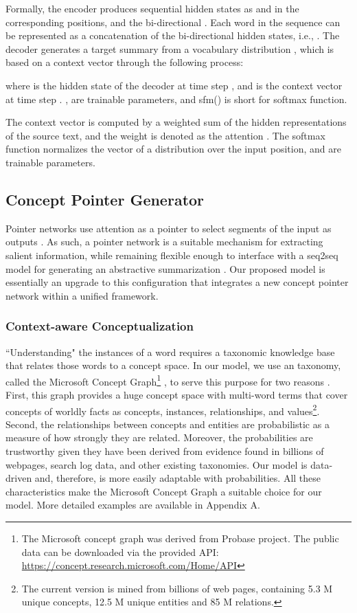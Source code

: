 \documentclass[11pt,a4paper]{article}
\begin{document}
Formally, the encoder  produces sequential hidden states as   and   in the corresponding positions, and the  bi-directional . Each word  in the sequence can be   represented as a concatenation of  the bi-directional hidden states, i.e., . 
The decoder  generates a  target summary from a vocabulary distribution , which is based on a context vector  through the following  process:

where   is the hidden state of the decoder at time step  , and  is the context vector at time step . ,  are trainable parameters, and  sfm() is short for softmax function. 
 
The context vector  is computed by a weighted sum of the hidden  representations of the source text, and the weight is denoted as the attention . 
The softmax function  normalizes the vector of a distribution over
the input position, and  are trainable parameters.

\subsection{Concept Pointer Generator}
 Pointer networks use attention as a pointer to select segments of the input as outputs \cite{vinyals2015pointer}. As such, a pointer network is a suitable mechanism for extracting salient information, while remaining flexible enough to interface with a seq2seq model for generating an abstractive summarization  \cite{DBLP:conf/acl/SeeLM17}. Our proposed model is essentially an upgrade to this configuration that integrates a new concept pointer network within a unified framework. 
 



 
\subsubsection{Context-aware Conceptualization}
``Understanding" the instances of a word requires a taxonomic knowledge base that relates those words to a concept space.  In our model, we use an  taxonomy, called the Microsoft Concept Graph\footnote{The Microsoft concept graph was derived from Probase project. The public data can be downloaded via the provided API:  \url{https://concept.research.microsoft.com/Home/API}} \cite{wang2015inference}, to serve this purpose for two reasons \cite{understanding-short-texts}. First, this graph provides a huge concept space with multi-word terms that cover concepts of worldly facts as concepts, instances, relationships, and values\footnote{The current version is mined from billions of web pages, containing 5.3 M unique concepts, 12.5  M unique entities and 85 M  relations.}.  Second, the relationships between concepts and entities are probabilistic as a measure of how strongly they are related. Moreover, the probabilities are trustworthy given they have been derived from evidence found in billions of webpages, search log data, and other existing taxonomies. Our model is data-driven and, therefore, is more easily adaptable with probabilities. All these characteristics make the Microsoft Concept Graph a suitable choice for our model.  More detailed examples are available in Appendix A.
 
\end{document}
